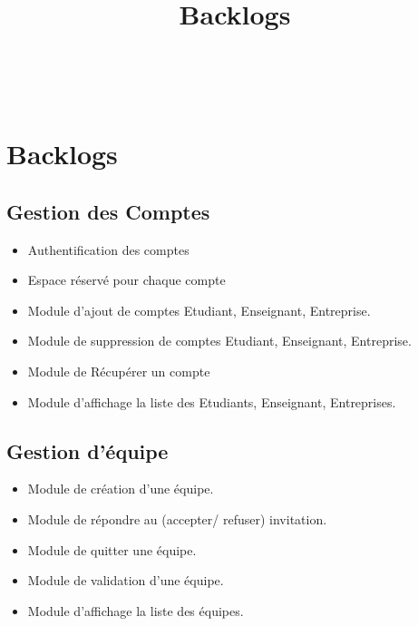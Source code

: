 \documentclass[11pt,fleqn]{book} %
\begin{document}
\title{Backlogs}

\begingroup
{}
\endgroup


\newpage
~\vfill
\thispagestyle{empty}


\pagestyle{empty} %

\tableofcontents %


\pagestyle{fancy} %

\chapter{Backlogs}
\section{Gestion des Comptes}
\begin{itemize}
    \item Authentification des comptes
    \item Espace réservé pour chaque compte
    \item Module d’ajout de comptes Etudiant, Enseignant, Entreprise.
    \item Module de suppression de comptes Etudiant, Enseignant, Entreprise.
    \item Module de Récupérer un compte
    \item Module d'affichage la liste des Etudiants, Enseignant, Entreprises. \\
\end{itemize}


\section{Gestion d'équipe}
\begin{itemize}
    \item Module de création d'une équipe.
    \item Module de répondre au (accepter/ refuser) invitation.
    \item Module de quitter une équipe.
    \item Module de validation d'une équipe.
    \item Module d'affichage la liste des équipes. \\
\end{itemize}
\end{document}
